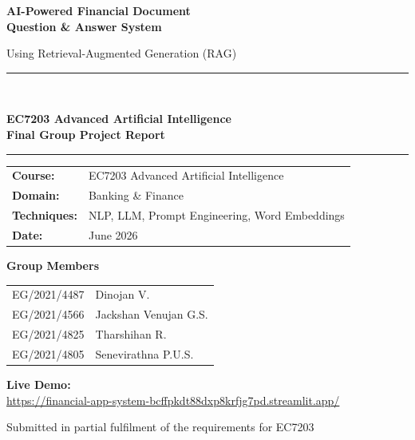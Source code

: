 \documentclass[12pt,a4paper]{article}
\begin{document}
\begin{titlepage}
  \centering
  \vspace*{1.3cm}

  {\LARGE\bfseries AI-Powered Financial Document\\[0.5em]
  Question \& Answer System\par}

  \vspace{0.7cm}
  {\large Using Retrieval-Augmented Generation (RAG)\par}

  \vspace{1cm}
  \rule{0.75\textwidth}{0.5pt}\\[1em]

  {\large\bfseries EC7203 Advanced Artificial Intelligence\\[0.3em]
  Final Group Project Report\par}

  \rule{0.75\textwidth}{0.5pt}

  \vspace{0.9cm}
  \begin{tabular}{@{}ll@{}}
    \textbf{Course:}     & EC7203 Advanced Artificial Intelligence \\[0.45em]
    \textbf{Domain:}     & Banking \& Finance \\[0.45em]
    \textbf{Techniques:} & NLP, LLM, Prompt Engineering, Word Embeddings \\[0.45em]
    \textbf{Date:}       & June 2026 \\
  \end{tabular}

  \vspace{0.9em}
  {\large\bfseries Group Members\par}
  \vspace{0.4em}
  \begin{tabular}{@{}ll@{}}
    EG/2021/4487 & Dinojan V. \\[0.25em]
    EG/2021/4566 & Jackshan Venujan G.S. \\[0.25em]
    EG/2021/4825 & Tharshihan R. \\[0.25em]
    EG/2021/4805 & Senevirathna P.U.S. \\
  \end{tabular}

  \vspace{0.9em}
  {\small\textbf{Live Demo:}\\[0.3em]
  \url{https://financial-app-system-bcffpkdt88dxp8krfjg7pd.streamlit.app/}\par}

  \vspace{0.9cm}
  {\small Submitted in partial fulfilment of the requirements for EC7203\par}
\end{titlepage}
\end{document}
